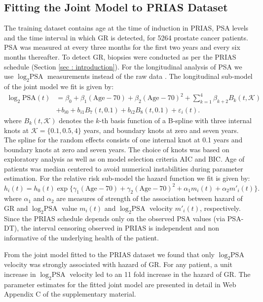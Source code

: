\subsection{Fitting the Joint Model to PRIAS Dataset}
\label{subsec : jm_fit_prias}
The training dataset contains age at the time of induction in PRIAS, PSA levels and the time interval in which GR is detected, for 5264 prostate cancer patients. PSA was measured at every three months for the first two years and every six months thereafter. To detect GR, biopsies were conducted as per the PRIAS schedule (Section \ref{sec : introduction}). For the longitudinal analysis of PSA we use $\log_2 \mbox{PSA}$ measurements instead of the raw data \citep{nieboer2015nonlinear}. The longitudinal sub-model of the joint model we fit is given by:
\begin{equation}
\label{eq : long_model_prias}
\begin{aligned}
\log_2 \mbox{PSA}(t) &= \beta_0 + \beta_1 (\mbox{Age}-70) + \beta_2 (\mbox{Age}-70)^2 + \sum_{k=1}^4 \beta_{k+2} B_k(t,\mathcal{K})\\ 
&+  b_{i0} + b_{i1} B_7(t, 0.1) + b_{i2} B_8(t, 0.1) +
\varepsilon_i(t).
\end{aligned}
\end{equation}
where $B_k(t, \mathcal{K})$ denotes the $k$-th basis function of a B-spline with three internal knots at $\mathcal{K} =\{0.1, 0.5, 4\}$ years, and boundary knots at zero and seven years. The spline for the random effects consists of one internal knot at 0.1 years and boundary knots at zero and seven years. The choice of knots was based on exploratory analysis as well as on model selection criteria AIC and BIC. Age of patients was median centered to avoid numerical instabilities during parameter estimation. For the relative risk sub-model the hazard function we fit is given by:
\begin{equation}
\label{eq : hazard_prias}
h_i(t) = h_0(t) \exp\big\{\gamma_1 (\mbox{Age}-70)  + \gamma_2 (\mbox{Age}-70)^2 + \alpha_1 m_i(t) + \alpha_2 m'_i(t)\big\}.
\end{equation}
where $\alpha_1$ and $\alpha_2$ are measures of strength of the association between hazard of GR and $\log_2 \mbox{PSA}$ value $m_i(t)$ and $\log_2 \mbox{PSA}$ velocity $m'_i(t)$, respectively. Since the PRIAS schedule depends only on the observed PSA values (via PSA-DT), the interval censoring observed in PRIAS is independent and non informative of the underlying health of the patient.

From the joint model fitted to the PRIAS dataset we found that only $\log_2 \mbox{PSA}$ velocity was strongly associated with hazard of GR. For any patient, a unit increase in $\log_2 \mbox{PSA}$ velocity led to an 11 fold increase in the hazard of GR. The parameter estimates for the fitted joint model are presented in detail in Web Appendix C of the supplementary material. 

